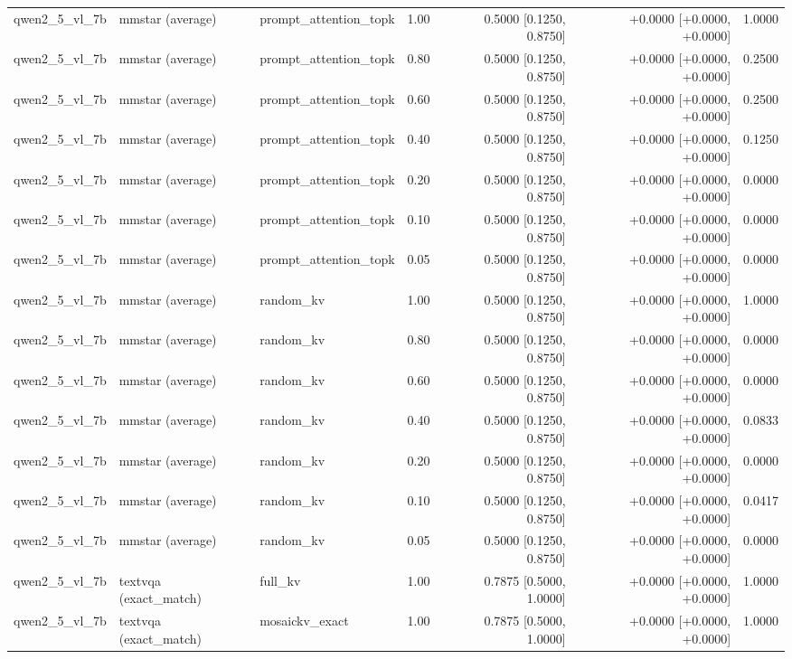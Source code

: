 \begin{longtable}{lllrrrr}
qwen2\_5\_vl\_7b & mmstar (average) & prompt\_attention\_topk & 1.00 & 0.5000 [0.1250, 0.8750] & +0.0000 [+0.0000, +0.0000] & 1.0000 \\
qwen2\_5\_vl\_7b & mmstar (average) & prompt\_attention\_topk & 0.80 & 0.5000 [0.1250, 0.8750] & +0.0000 [+0.0000, +0.0000] & 0.2500 \\
qwen2\_5\_vl\_7b & mmstar (average) & prompt\_attention\_topk & 0.60 & 0.5000 [0.1250, 0.8750] & +0.0000 [+0.0000, +0.0000] & 0.2500 \\
qwen2\_5\_vl\_7b & mmstar (average) & prompt\_attention\_topk & 0.40 & 0.5000 [0.1250, 0.8750] & +0.0000 [+0.0000, +0.0000] & 0.1250 \\
qwen2\_5\_vl\_7b & mmstar (average) & prompt\_attention\_topk & 0.20 & 0.5000 [0.1250, 0.8750] & +0.0000 [+0.0000, +0.0000] & 0.0000 \\
qwen2\_5\_vl\_7b & mmstar (average) & prompt\_attention\_topk & 0.10 & 0.5000 [0.1250, 0.8750] & +0.0000 [+0.0000, +0.0000] & 0.0000 \\
qwen2\_5\_vl\_7b & mmstar (average) & prompt\_attention\_topk & 0.05 & 0.5000 [0.1250, 0.8750] & +0.0000 [+0.0000, +0.0000] & 0.0000 \\
qwen2\_5\_vl\_7b & mmstar (average) & random\_kv & 1.00 & 0.5000 [0.1250, 0.8750] & +0.0000 [+0.0000, +0.0000] & 1.0000 \\
qwen2\_5\_vl\_7b & mmstar (average) & random\_kv & 0.80 & 0.5000 [0.1250, 0.8750] & +0.0000 [+0.0000, +0.0000] & 0.0000 \\
qwen2\_5\_vl\_7b & mmstar (average) & random\_kv & 0.60 & 0.5000 [0.1250, 0.8750] & +0.0000 [+0.0000, +0.0000] & 0.0000 \\
qwen2\_5\_vl\_7b & mmstar (average) & random\_kv & 0.40 & 0.5000 [0.1250, 0.8750] & +0.0000 [+0.0000, +0.0000] & 0.0833 \\
qwen2\_5\_vl\_7b & mmstar (average) & random\_kv & 0.20 & 0.5000 [0.1250, 0.8750] & +0.0000 [+0.0000, +0.0000] & 0.0000 \\
qwen2\_5\_vl\_7b & mmstar (average) & random\_kv & 0.10 & 0.5000 [0.1250, 0.8750] & +0.0000 [+0.0000, +0.0000] & 0.0417 \\
qwen2\_5\_vl\_7b & mmstar (average) & random\_kv & 0.05 & 0.5000 [0.1250, 0.8750] & +0.0000 [+0.0000, +0.0000] & 0.0000 \\
qwen2\_5\_vl\_7b & textvqa (exact\_match) & full\_kv & 1.00 & 0.7875 [0.5000, 1.0000] & +0.0000 [+0.0000, +0.0000] & 1.0000 \\
qwen2\_5\_vl\_7b & textvqa (exact\_match) & mosaickv\_exact & 1.00 & 0.7875 [0.5000, 1.0000] & +0.0000 [+0.0000, +0.0000] & 1.0000 \\

\end{longtable}
